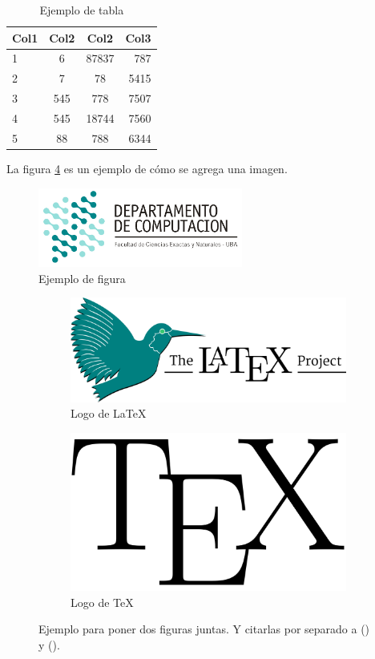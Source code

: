\documentclass[10pt,a4paper]{article}
\begin{document}
\begin{table}[h!]
	\centering
	\begin{tabular}{||l c c r||} 
		\hline
		Col1 & Col2 & Col2 & Col3 \\ [0.5ex] 
		\hline\hline
		1 & 6 & 87837 & 787 \\ 
		2 & 7 & 78 & 5415 \\
		3 & 545 & 778 & 7507 \\
		4 & 545 & 18744 & 7560 \\
		5 & 88 & 788 & 6344 \\
		\hline
	\end{tabular}
	\caption{Ejemplo de tabla}
	\label{tab:ejemplo}
\end{table}


La figura \ref{fig:subfigs} es un ejemplo de cómo se agrega una imagen.

\begin{figure}[ht]
	\centering
	\includegraphics[width=0.6\textwidth]{logo_dc.jpg}
	\caption{Ejemplo de figura}
	\label{fig:ejemplo}
\end{figure}

\begin{figure}[ht!]
	\begin{subfigure}{0.5\textwidth}
		\includegraphics[width=0.5\linewidth]{LaTeX-project} 
		\caption{Logo de LaTeX}
		\label{fig:subfig1}
	\end{subfigure}
	\begin{subfigure}{0.8\textwidth}
		\includegraphics[width=0.2\linewidth]{TeX}
		\caption{Logo de TeX}
		\label{fig:subfig2}
	\end{subfigure}
	\caption{Ejemplo para poner dos figuras juntas. Y citarlas por separado a () y ().}
	\label{fig:subfigs}
\end{figure}
\end{document}

